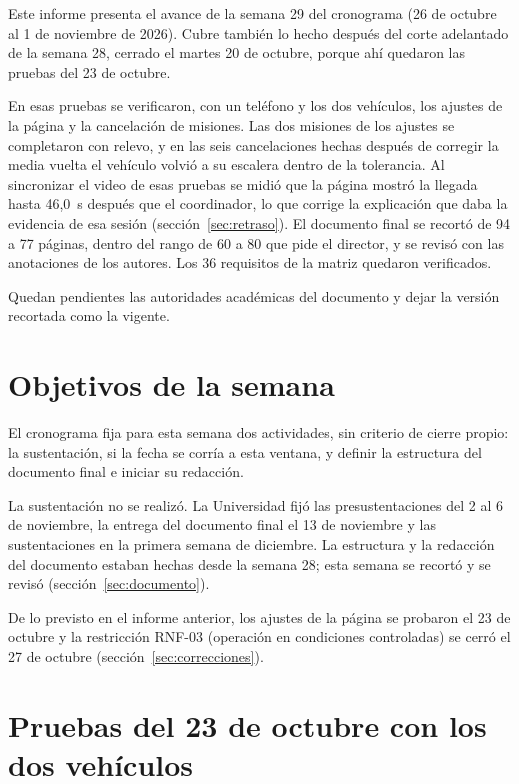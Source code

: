 \documentclass[12pt,letterpaper]{article}
\begin{document}
Este informe presenta el avance de la semana 29 del cronograma (26 de octubre al 1 de noviembre de 2026). Cubre también lo hecho después del corte adelantado de la semana 28, cerrado el martes 20 de octubre, porque ahí quedaron las pruebas del 23 de octubre.

En esas pruebas se verificaron, con un teléfono y los dos vehículos, los ajustes de la página y la cancelación de misiones. Las dos misiones de los ajustes se completaron con relevo, y en las seis cancelaciones hechas después de corregir la media vuelta el vehículo volvió a su escalera dentro de la tolerancia. Al sincronizar el video de esas pruebas se midió que la página mostró la llegada hasta 46,0~s después que el coordinador, lo que corrige la explicación que daba la evidencia de esa sesión (sección~\ref{sec:retraso}). El documento final se recortó de 94 a 77 páginas, dentro del rango de 60 a 80 que pide el director, y se revisó con las anotaciones de los autores. Los 36 requisitos de la matriz quedaron verificados.

Quedan pendientes las autoridades académicas del documento y dejar la versión recortada como la vigente.

\section{Objetivos de la semana}

El cronograma fija para esta semana dos actividades, sin criterio de cierre propio: la sustentación, si la fecha se corría a esta ventana, y definir la estructura del documento final e iniciar su redacción.

La sustentación no se realizó. La Universidad fijó las presustentaciones del 2 al 6 de noviembre, la entrega del documento final el 13 de noviembre y las sustentaciones en la primera semana de diciembre. La estructura y la redacción del documento estaban hechas desde la semana 28; esta semana se recortó y se revisó (sección~\ref{sec:documento}).

De lo previsto en el informe anterior, los ajustes de la página se probaron el 23 de octubre y la restricción RNF-03 (operación en condiciones controladas) se cerró el 27 de octubre (sección~\ref{sec:correcciones}).

\section{Pruebas del 23 de octubre con los dos vehículos}
\end{document}

